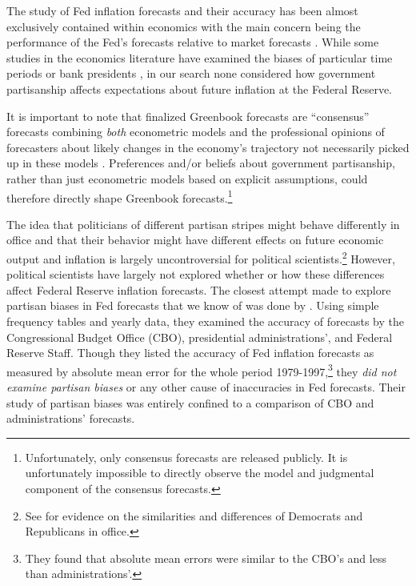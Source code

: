 \documentclass[a4paper]{article}
\begin{document}
The study of Fed inflation forecasts and their accuracy has been almost exclusively contained within economics with the main concern being the performance of the Fed's forecasts relative to market forecasts \cite[e.g.][]{Romer2000,Faust2007, Gamber2009}. While some studies in the economics literature have examined the biases of particular time periods \cite[e.g.][]{Capistran2006} or bank presidents \cite[e.g.][]{Havrilesky1995}, in our search none considered how government partisanship affects expectations about future inflation at the Federal Reserve.
 
It is important to note that finalized Greenbook forecasts are ``consensus'' forecasts combining \emph{both} econometric models and the professional opinions of forecasters about likely changes in the economy's trajectory not necessarily picked up in these models \citep{Karamouzis1989,Reifschneider1997}. Preferences and/or beliefs about government partisanship, rather than just econometric models based on explicit assumptions, could therefore directly shape Greenbook forecasts.\footnote{Unfortunately, only consensus forecasts are released publicly. It is unfortunately impossible to directly observe the model and judgmental component of the consensus forecasts.} 

The idea that politicians of different partisan stripes might behave differently in office and that their behavior might have different effects on future economic output and inflation is largely uncontroversial for political scientists.\footnote{See \cite{Bartels2008} for evidence on the similarities and differences of Democrats and Republicans in office.} However, political scientists have largely not explored whether or how these differences affect Federal Reserve inflation forecasts. The closest attempt made to explore partisan biases in Fed forecasts that we know of was done by \cite{Frendreis2000}. Using simple frequency tables and yearly data, they examined the accuracy of forecasts by the Congressional Budget Office (CBO), presidential administrations', and Federal Reserve Staff. Though they listed the accuracy of Fed inflation forecasts as measured by absolute mean error for the whole period 1979-1997,\footnote{They found that absolute mean errors were similar to the CBO's and less than administrations'.} they \emph{did not examine partisan biases} or any other cause of inaccuracies in Fed forecasts. Their study of partisan biases was entirely confined to a comparison of CBO and administrations' forecasts. 

\end{document}
